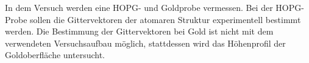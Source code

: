 In dem Versuch werden eine HOPG- und Goldprobe vermessen.
Bei der HOPG-Probe sollen die Gittervektoren der atomaren Struktur
experimentell bestimmt werden. Die Bestimmung der Gittervektoren
bei Gold ist nicht mit dem verwendeten Versuchsaufbau möglich, stattdessen
wird das Höhenprofil der Goldoberfläche untersucht.
